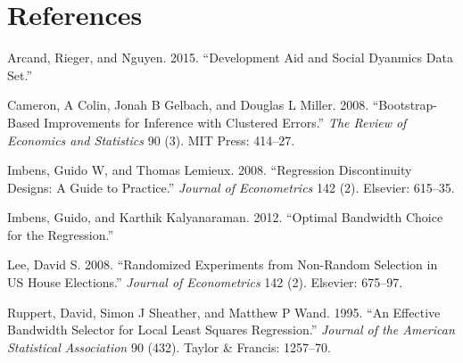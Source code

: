\documentclass[article]{jss}
\begin{document}
\section*{References}\label{references}

Arcand, Rieger, and Nguyen. 2015. ``Development Aid and Social Dyanmics
Data Set.''

Cameron, A Colin, Jonah B Gelbach, and Douglas L Miller. 2008.
``Bootstrap-Based Improvements for Inference with Clustered Errors.''
\emph{The Review of Economics and Statistics} 90 (3). MIT Press:
414--27.

Imbens, Guido W, and Thomas Lemieux. 2008. ``Regression Discontinuity
Designs: A Guide to Practice.'' \emph{Journal of Econometrics} 142 (2).
Elsevier: 615--35.

Imbens, Guido, and Karthik Kalyanaraman. 2012. ``Optimal Bandwidth
Choice for the Regression.''

Lee, David S. 2008. ``Randomized Experiments from Non-Random Selection
in US House Elections.'' \emph{Journal of Econometrics} 142 (2).
Elsevier: 675--97.

Ruppert, David, Simon J Sheather, and Matthew P Wand. 1995. ``An
Effective Bandwidth Selector for Local Least Squares Regression.''
\emph{Journal of the American Statistical Association} 90 (432). Taylor
\& Francis: 1257--70.
\end{document}
